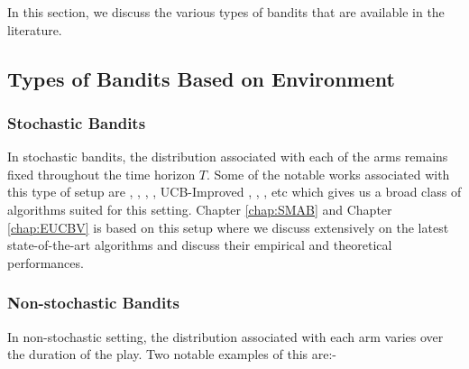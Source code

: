 In this section, we discuss the various types of bandits that are available in the literature. 


\subsection{Types of Bandits Based on Environment}


\subsubsection{Stochastic Bandits}
In stochastic bandits, the distribution associated with each of the arms remains fixed throughout the time horizon $T$. Some of the notable works associated with this type of setup are \citet{robbins1952some}, \citet{lai1985asymptotically},  \citet{agrawal1995sample}, \citet{auer2002finite}, UCB-Improved \citet{auer2010ucb}, \citet{audibert2009minimax}, \citet{lattimore2015optimally}, etc which gives us a broad class of algorithms suited for this setting. Chapter \ref{chap:SMAB} and Chapter \ref{chap:EUCBV} is based on this setup where we discuss extensively on the latest state-of-the-art algorithms and discuss their empirical and theoretical performances.



\subsubsection{Non-stochastic Bandits}

In non-stochastic setting, the distribution associated with each arm varies over the duration of the play. Two notable examples of this are:-


